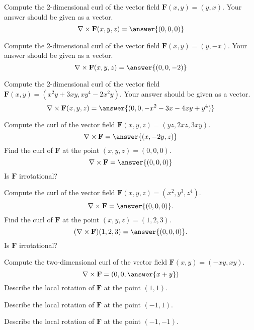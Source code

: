 \documentclass{ximera}
\begin{document}
\begin{problem}
Compute the 2-dimensional curl of the vector field $\mathbf{F}(x,y) = (y,x)$. Your answer should be given as a vector.
\[
\nabla\times\mathbf{F}(x,y,z) = \answer{(0,0,0)}
\]
\end{problem}

\begin{problem}
Compute the 2-dimensional curl of the vector field $\mathbf{F}(x,y) = (y,-x)$. Your answer should be given as a vector.
\[
\nabla\times\mathbf{F}(x,y,z) = \answer{(0,0,-2)}
\]
\end{problem}

\begin{problem}
Compute the 2-dimensional curl of the vector field $\mathbf{F}(x,y) = (x^2y+3xy,xy^4-2x^2y)$. Your answer should be given as a vector.
\[
\nabla\times\mathbf{F}(x,y,z) = \answer{(0,0,-x^2-3x-4xy+y^4)}
\]
\end{problem}

\begin{problem}
Compute the curl of the vector field $\mathbf{F}(x,y,z) = (yz, 2xz, 3xy)$.
\[
\nabla\times \mathbf{F} = \answer{(x, -2y, z)}
\]
Find the curl of $\mathbf{F}$ at the point $(x,y,z) = (0,0,0)$.
\[
\nabla\times \mathbf{F} = \answer{(0, 0, 0)}
\]
Is $\mathbf{F}$ irrotational?
\begin{multipleChoice}
\end{multipleChoice}
\end{problem}

\begin{problem}
Compute the curl of the vector field $\mathbf{F}(x,y,z) = (x^2, y^3, z^4)$.
\[
\nabla\times \mathbf{F} = \answer{(0,0,0)}.
\]
Find the curl of $\mathbf{F}$ at the point $(x,y,z) = (1,2,3)$.
\[
(\nabla\times \mathbf{F})(1,2,3) = \answer{(0,0,0)}.
\]
Is $\mathbf{F}$ irrotational?
\begin{multipleChoice}
\end{multipleChoice}
\end{problem}

\begin{problem}
Compute the two-dimensional curl of the vector field $\mathbf{F}(x,y) = (-xy, xy)$.
\[
\nabla\times \mathbf{F} = \left(0,0,\answer{x+y}\right)
\]
Describe the local rotation of $\mathbf{F}$ at the point $(1,1)$.
\begin{multipleChoice}
\end{multipleChoice}
Describe the local rotation of $\mathbf{F}$ at the point $(-1,1)$.
\begin{multipleChoice}
\end{multipleChoice}
Describe the local rotation of $\mathbf{F}$ at the point $(-1,-1)$.
\begin{multipleChoice}
\end{multipleChoice}
\end{problem}
\end{document}
